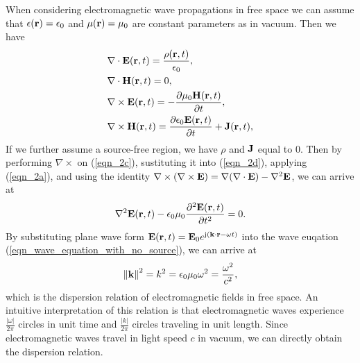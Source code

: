 \documentclass[12pt,draftclsnofoot,journal,onecolumn]{IEEEtran}
\begin{document}
{When considering electromagnetic wave propagations in free space we can assume that $\epsilon({\bf r}) = \epsilon_0$ and $\mu({\bf r}) = \mu_0$ are constant parameters as in vacuum. Then we have
\begin{subequations}
	\begin{align} 
		& \nabla \cdot  {\bf E}({\bf r},t) = \frac{\rho({\bf r},t)}{\epsilon_0}, \label{eqn_2a}\\
		& \nabla \cdot {\bf H}({\bf r},t) = 0,\\
		&\nabla \times {\bf E}({\bf r},t) = -\frac{\partial \mu_0 {\bf H}({\bf r},t)}{\partial t}, \label{eqn_2c}\\
		& \nabla \times {\bf H}({\bf r},t) = \frac{ \partial \epsilon_0 {\bf E}({\bf r},t)}{\partial t}+{\bf J}({\bf r},t) \label{eqn_2d}, 
	\end{align}
	\label{eqn_2}
\end{subequations}
If we further assume a source-free region, we have $\rho$ and ${\bf J}$ equal to 0. Then by performing $\nabla\times $ on (\ref{eqn_2c}), sustituting it into (\ref{eqn_2d}), applying (\ref{eqn_2a}), and using the identity $\nabla\times(\nabla\times {\bf E}) = \nabla(\nabla\cdot {\bf E})-\nabla^2 {\bf E}$, we can arrive at
\begin{equation}
	\begin{aligned}
		\nabla^2 {\bf E}({\bf r},t) - \epsilon_0 \mu_0 \frac{\partial^2 {\bf E}({\bf r},t)}{\partial t^2} = 0. 
	\end{aligned}
	\label{eqn_wave_equation_with_no_source}
\end{equation}
By substituting plane wave form ${\bf E}({\bf r},t) = {\bf E}_0 e^{{\rm j}({\bf k}\cdot {\bf r}-\omega t)}$ into the wave euqation (\ref{eqn_wave_equation_with_no_source}), we can arrive at
\begin{equation}
	\left\|  {\bf k} \right\|^2 = k^2 = \epsilon_0 \mu_0 \omega^2 = \frac{\omega^2}{c^2},
	\label{eqn_dispersion_relation}
\end{equation}
which is the dispersion relation of electromagnetic fields in free space. An intuitive interpretation of this relation is that electromagnetic waves experience $\frac{|\omega|}{2\pi}$ circles in unit time and $\frac{|k|}{2\pi}$ circles traveling in unit length. Since electromagnetic waves travel in light speed $c$ in vacuum, we can directly obtain the dispersion relation.

}
\end{document}
